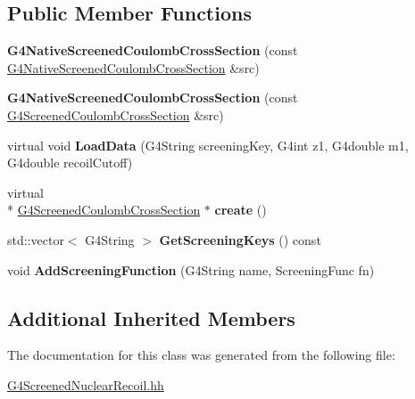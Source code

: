 \subsection*{Public Member Functions}
\begin{DoxyCompactItemize}
\item 
\hypertarget{classG4NativeScreenedCoulombCrossSection_a14ed45f2a40f067aa322117d1decf3e4}{{\bfseries G4\-Native\-Screened\-Coulomb\-Cross\-Section} (const \hyperlink{classG4NativeScreenedCoulombCrossSection}{G4\-Native\-Screened\-Coulomb\-Cross\-Section} \&src)}\label{classG4NativeScreenedCoulombCrossSection_a14ed45f2a40f067aa322117d1decf3e4}

\item 
\hypertarget{classG4NativeScreenedCoulombCrossSection_ab7469968817dc11e563c6c65aa541a40}{{\bfseries G4\-Native\-Screened\-Coulomb\-Cross\-Section} (const \hyperlink{classG4ScreenedCoulombCrossSection}{G4\-Screened\-Coulomb\-Cross\-Section} \&src)}\label{classG4NativeScreenedCoulombCrossSection_ab7469968817dc11e563c6c65aa541a40}

\item 
\hypertarget{classG4NativeScreenedCoulombCrossSection_ab616397fbc1b8275cdc68a93268e80ad}{virtual void {\bfseries Load\-Data} (G4\-String screening\-Key, G4int z1, G4double m1, G4double recoil\-Cutoff)}\label{classG4NativeScreenedCoulombCrossSection_ab616397fbc1b8275cdc68a93268e80ad}

\item 
\hypertarget{classG4NativeScreenedCoulombCrossSection_a13aac6dd8ff1af94467217d261b81898}{virtual \\*
\hyperlink{classG4ScreenedCoulombCrossSection}{G4\-Screened\-Coulomb\-Cross\-Section} $\ast$ {\bfseries create} ()}\label{classG4NativeScreenedCoulombCrossSection_a13aac6dd8ff1af94467217d261b81898}

\item 
\hypertarget{classG4NativeScreenedCoulombCrossSection_a04c8348f479aabc692ab4818e712e1e5}{std\-::vector$<$ G4\-String $>$ {\bfseries Get\-Screening\-Keys} () const }\label{classG4NativeScreenedCoulombCrossSection_a04c8348f479aabc692ab4818e712e1e5}

\item 
\hypertarget{classG4NativeScreenedCoulombCrossSection_ac068a0ceb26658fed8c15bfb67b26062}{void {\bfseries Add\-Screening\-Function} (G4\-String name, Screening\-Func fn)}\label{classG4NativeScreenedCoulombCrossSection_ac068a0ceb26658fed8c15bfb67b26062}

\end{DoxyCompactItemize}
\subsection*{Additional Inherited Members}


The documentation for this class was generated from the following file\-:\begin{DoxyCompactItemize}
\item 
\hyperlink{G4ScreenedNuclearRecoil_8hh}{G4\-Screened\-Nuclear\-Recoil.\-hh}\end{DoxyCompactItemize}
